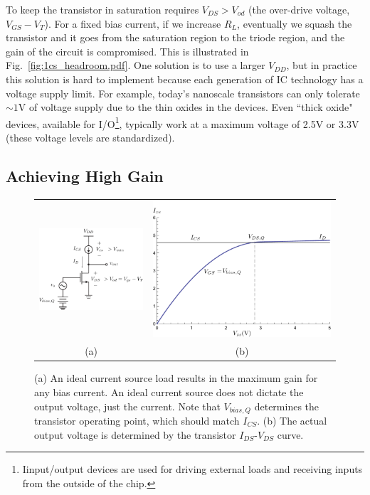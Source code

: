 To keep the transistor in saturation requires $V_{DS} > V_{od}$ (the over-drive voltage, $V_{GS} - V_T$).  For a fixed bias current, if we increase $R_L$, eventually we squash the transistor and it goes from the saturation region to the triode region, and the gain of the circuit is compromised.  This is illustrated in Fig.~\ref{fig:1cs_headroom.pdf}.  One solution is to use a larger $V_{DD}$, but in practice this solution is hard to implement because each generation of IC technology has a voltage supply limit.  For example, today's nanoscale transistors can only tolerate $\sim 1$V of voltage supply due to the thin oxides in the devices.  Even ``thick oxide" devices, available for I/O\footnote{Iinput/output devices are used for driving external loads and receiving inputs from the outside of the chip.}, typically work at a maximum voltage of 2.5V or 3.3V (these voltage levels are standardized).
 

\subsection{Achieving High Gain}



\begin{figure}[tb]
\begin{center}
\begin{tabular}{cc}
\includegraphics[width=.5\columnwidth]{2cs_current_mirror_load.pdf} &
\includegraphics[width=.5\columnwidth]{mos_output_voltage.pdf} \\
(a) & (b) \\
\end{tabular}
\end{center}
\caption{(a) An ideal current source load results in the maximum gain for any bias current.  An ideal current source does not dictate the output voltage, just the current.  Note that $V_{bias,Q}$ determines the transistor operating point, which should match $I_{CS}$.  (b) The actual output voltage is determined by the transistor $I_{DS}$-$V_{DS}$ curve.} \label{fig:2cs_current_mirror_load.pdf}
\end{figure}

